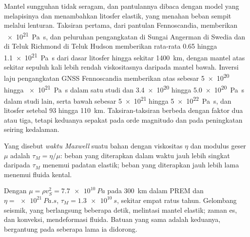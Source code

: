 Mantel sungguhan tidak seragam, dan pantulannya dibaca dengan model yang melapisinya
dan menambahkan litosfer elastik, yang menahan beban sempit melalui lenturan. Taksiran
pertama, dari pantulan Fennoscandia, memberikan \qty{e21}{Pa.s}, dan
peluruhan pengangkatan di Sungai Angerman di Swedia dan di Teluk Richmond di
Teluk Hudson memberikan rata-rata 0.65 hingga \qty{1.1e21}{Pa.s} dari dasar
litosfer hingga sekitar \qty{1400}{km}, dengan mantel atas sekitar sepuluh kali
lebih rendah viskositasnya daripada mantel bawah. Inversi laju pengangkatan GNSS
Fennoscandia memberikan  atas sebesar \num{5e20} hingga \qty{e21}{Pa.s}
dalam satu studi dan \num{3.4e20} hingga \qty{5.0e20}{Pa.s} dalam studi lain, serta  bawah sebesar \num{5e21} hingga \qty{5e22}{Pa.s}, dan litosfer setebal 93 hingga
\qty{110}{km}. Taksiran-taksiran berbeda dengan faktor dua atau tiga, tetapi keduanya
sepakat pada orde magnitudo dan pada peningkatan seiring kedalaman.

\begin{definition}\label{def:b3:mantle-convection:maxwell}
Yang disebut \emph{waktu Maxwell} suatu bahan dengan viskositas $\eta$
dan modulus geser $\mu$ adalah $\tau_M = \eta/\mu$: beban yang diterapkan dalam waktu jauh lebih singkat daripada
$\tau_M$ menemui padatan elastik; beban yang diterapkan jauh lebih lama menemui fluida kental.
\end{definition}

Dengan $\mu = \rho v_S^2 = \qty{7.7e10}{Pa}$ pada \qty{300}{km} dalam PREM dan $\eta =
\qty{e21}{Pa.s}$, $\tau_M = \qty{1.3e10}{s}$, sekitar empat ratus tahun. Gelombang
seismik, yang berlangsung beberapa detik, melintasi mantel elastik; zaman es, dan
konveksi, mendeformasi fluida. Batuan yang sama adalah keduanya, bergantung pada seberapa lama ia
didorong.

